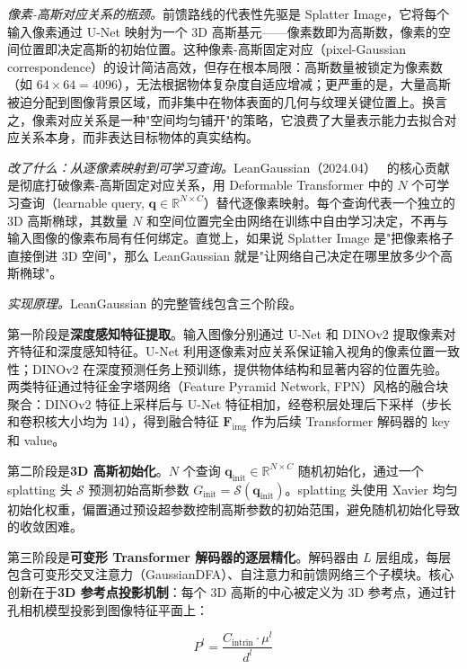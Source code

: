 \textit{像素-高斯对应关系的瓶颈。}\;前馈路线的代表性先驱是 Splatter Image，它将每个输入像素通过 U-Net 映射为一个 3D 高斯基元——像素数即为高斯数，像素的空间位置即决定高斯的初始位置。这种像素-高斯固定对应（pixel-Gaussian correspondence）的设计简洁高效，但存在根本局限：高斯数量被锁定为像素数（如 $64 \times 64 = 4096$），无法根据物体复杂度自适应增减；更严重的是，大量高斯被迫分配到图像背景区域，而非集中在物体表面的几何与纹理关键位置上。换言之，像素对应关系是一种"空间均匀铺开"的策略，它浪费了大量表示能力去拟合对应关系本身，而非表达目标物体的真实结构。

\textit{改了什么：从逐像素映射到可学习查询。}\;LeanGaussian（2024.04）~\cite{2404_16323} 的核心贡献是彻底打破像素-高斯固定对应关系，用 Deformable Transformer 中的 $N$ 个可学习查询（learnable query, $\mathbf{q} \in \mathbb{R}^{N \times C}$）替代逐像素映射。每个查询代表一个独立的 3D 高斯椭球，其数量 $N$ 和空间位置完全由网络在训练中自由学习决定，不再与输入图像的像素布局有任何绑定。直觉上，如果说 Splatter Image 是"把像素格子直接倒进 3D 空间"，那么 LeanGaussian 就是"让网络自己决定在哪里放多少个高斯椭球"。

\textit{实现原理。}\;LeanGaussian 的完整管线包含三个阶段。

第一阶段是\textbf{深度感知特征提取}。输入图像分别通过 U-Net 和 DINOv2 提取像素对齐特征和深度感知特征。U-Net 利用逐像素对应关系保证输入视角的像素位置一致性；DINOv2 在深度预测任务上预训练，提供物体结构和显著内容的位置先验。两类特征通过特征金字塔网络（Feature Pyramid Network, FPN）风格的融合块聚合：DINOv2 特征上采样后与 U-Net 特征相加，经卷积层处理后下采样（步长和卷积核大小均为 14），得到融合特征 $\mathbf{F}_{\mathrm{img}}$ 作为后续 Transformer 解码器的 key 和 value。

第二阶段是\textbf{3D 高斯初始化}。$N$ 个查询 $\mathbf{q}_{\mathrm{init}} \in \mathbb{R}^{N \times C}$ 随机初始化，通过一个 splatting 头 $\mathcal{S}$ 预测初始高斯参数 $G_{\mathrm{init}} = \mathcal{S}(\mathbf{q}_{\mathrm{init}})$。splatting 头使用 Xavier 均匀初始化权重，偏置通过预设超参数控制高斯参数的初始范围，避免随机初始化导致的收敛困难。

第三阶段是\textbf{可变形 Transformer 解码器的逐层精化}。解码器由 $L$ 层组成，每层包含可变形交叉注意力（GaussianDFA）、自注意力和前馈网络三个子模块。核心创新在于\textbf{3D 参考点投影机制}：每个 3D 高斯的中心被定义为 3D 参考点，通过针孔相机模型投影到图像特征平面上：

\begin{equation}
\label{eq:leangaussian_proj}
P^l = \frac{C_{\mathrm{intrin}} \cdot \mu^l}{d^l}
\end{equation}

